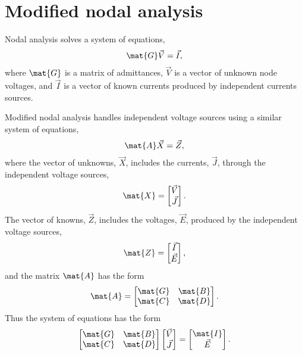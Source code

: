 \documentclass[a4paper, 12pt]{article}
\begin{document}
\section{Modified nodal analysis}

Nodal analysis solves a system of equations,
%
\begin{equation}
  \mat{G} \vec{V} = \vec{I},
\end{equation}
%
where $\mat{G}$ is a matrix of admittances, $\vec{V}$ is a vector of
unknown node voltages, and $\vec{I}$ is a vector of known currents
produced by independent currents sources.

Modified nodal analysis handles independent voltage sources using a
similar system of equations,
%
\begin{equation}
  \mat{A} \vec{X} = \vec{Z},
\end{equation}
%
where the vector of unknowns, $\vec{X}$, includes the currents,
$\vec{J}$, through the independent voltage sources,
%
\begin{equation}
  \mat{X} =   
  \begin{bmatrix}
    \vec{V} \\ \vec{J}
  \end{bmatrix}.
\end{equation}
%
The vector of knowns, $\vec{Z}$, includes the voltages, $\vec{E}$,
produced by the independent voltage sources,
%
\begin{equation}
    \mat{Z} =   
  \begin{bmatrix}
    \vec{I} \\ \vec{E}
  \end{bmatrix},
\end{equation}
%
and the matrix $\mat{A}$ has the form
%
\begin{equation}
  \mat{A} =
  \begin{bmatrix}
    \mat{G} & \mat{B} \\
    \mat{C} & \mat{D} \\
  \end{bmatrix}.
\end{equation}
%
Thus the system of equations has the form
%
\begin{equation}
  \begin{bmatrix}
    \mat{G} & \mat{B} \\
    \mat{C} & \mat{D} \\
  \end{bmatrix}
  \begin{bmatrix}
    \vec{V} \\ \vec{J}
  \end{bmatrix}
=
  \begin{bmatrix}
    \mat{I} \\ \vec{E}
  \end{bmatrix}.
\end{equation}
\end{document}
